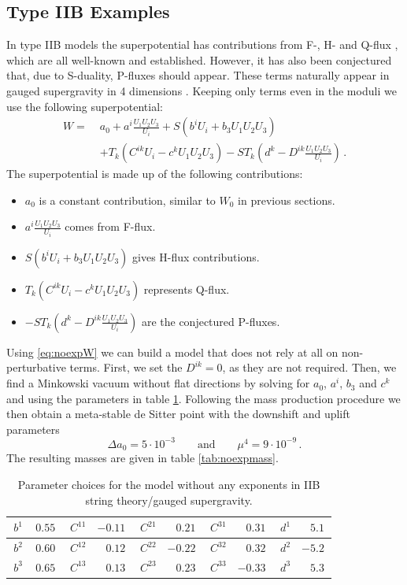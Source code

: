 \documentclass[a4paper,12pt,twoside,openright]{report}
\newcommand{\be}{\begin{equation}}
\newcommand{\ee}{\end{equation}}
\newcommand{\bea}{\begin{equation}\begin{aligned}}
\newcommand{\eea}{\end{aligned}\end{equation}}
\begin{document}
\subsection{Type IIB Examples}
In type IIB models the superpotential has contributions from F-, H- and Q-flux \cite{Aldazabal:2006up,Dibitetto:2011gm,Blaback:2013ht}, which are all well-known and established. However, it has also been conjectured that, due to S-duality, P-fluxes should appear. These terms naturally appear in gauged supergravity in 4 dimensions \cite{Dibitetto:2011gm}. Keeping only terms even in the moduli we use the following superpotential:
\bea
\label{eq:noexpW}
W =\; &a_0 + a^i \frac{U_1 U_2 U_3}{U_i} + S \left( b^i U_i + b_3 U_1 U_2 U_3 \right) \\
&+ T_k \left( C^{ik}U_i - c^k U_1 U_2 U_3\right) - S T_k \left( d^k -D^{ik}\frac{U_1 U_2 U_3}{U_i}\right)\,.
\eea
The superpotential is made up of the following contributions:
\begin{itemize}
\item $a_0$ is a constant contribution, similar to $W_0$ in previous sections.
\item $a^i \frac{U_1 U_2 U_3}{U_i}$ comes from F-flux.
\item $S \left( b^i U_i + b_3 U_1 U_2 U_3 \right)$ gives H-flux contributions.
\item $T_k \left( C^{ik}U_i - c^k U_1 U_2 U_3\right)$ represents Q-flux.
\item $- S T_k \left( d^k -D^{ik}\frac{U_1 U_2 U_3}{U_i}\right)$ are the conjectured P-fluxes.
\end{itemize}
Using \eqref{eq:noexpW} we can build a model that does not rely at all on non-perturbative terms. First, we set the $D^{ik}=0$, as they are not required. Then, we find a Minkowski vacuum without flat directions by solving for $a_0$, $a^i$, $b_3$ and $c^k$ and using the parameters in table \ref{tab:noexppara}. Following the mass production procedure we then obtain a meta-stable de Sitter point with the downshift and uplift parameters
\be 
\Delta a_0 = 5 \cdot 10^{-3}\qquad \text{and} \qquad \mu^4 = 9\cdot 10^{-9}\,.
\ee
The resulting masses are given in table \ref{tab:noexpmass}.
\begin{table}[htb]
\center
\begin{tabular}{|r|r||r|r||r|r||r|r||r|r|}\hline
$\,b^{1}$ & $\, 0.55 \,$  & $\,C^{11}$ & $ -0.11 \,$ & $\,C^{21}$ & $\, 0.21 \,$ & $\,C^{31}$ & $\, 0.31 \,$ & $\,d^{1}$ & $\, 5.1 \,$ \\\hline
$\,b^{2}$ & $\, 0.60 \,$ & $\,C^{12}$ & $\, 0.12 \,$ & $\,C^{22}$ & $ -0.22 \,$ & $\,C^{32}$ & $\, 0.32 \,$ & $\,d^{2}$ & $ -5.2 \,$ \\\hline
$\,b^{3}$ & $\, 0.65 \,$ & $\,C^{13}$ & $\, 0.13 \,$ & $\,C^{23}$ & $\, 0.23 \,$ & $\,C^{33}$ & $ -0.33 \,$ & $\,d^{3}$ & $\, 5.3 \,$ \\\hline
\end{tabular}
\caption{Parameter choices for the model without any exponents in IIB string theory/gauged supergravity.}
\label{tab:noexppara}
\end{table}
\end{document}
